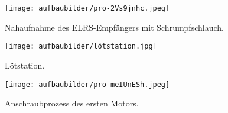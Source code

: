 \begin{figure}[htbp]	
	\begin{minipage}[b]{0.3\textwidth}
		\centering
		\texttt{[image: aufbaubilder/pro-2Vs9jnhc.jpeg]}
		\caption{Nahaufnahme des ELRS-Empfängers mit Schrumpfschlauch.}
		\label{fig:aufbau14}
	\end{minipage}%
	\hfill
	\begin{minipage}[b]{0.3\textwidth}
		\centering
		\texttt{[image: aufbaubilder/lötstation.jpg]}
		\caption{Lötstation.}
		\label{fig:aufbau15}
	\end{minipage}%
	\hfill
	\begin{minipage}[b]{0.3\textwidth}
		\centering
		\texttt{[image: aufbaubilder/pro-meIUnESh.jpeg]}
		\caption{Anschraubprozess des ersten Motors.}
		\label{fig:aufbau16}
	\end{minipage}
\end{figure}








